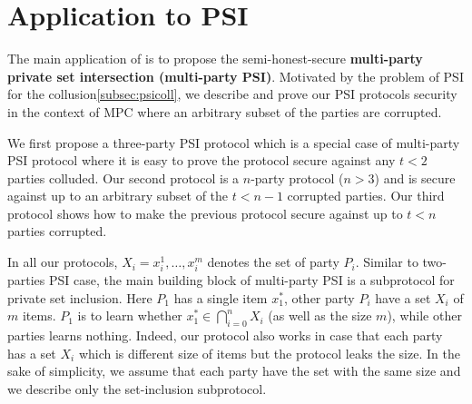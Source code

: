\section{Application to PSI}
\label{sec:psi}
The main application of \OPPRF is to propose the semi-honest-secure \textbf{multi-party private set intersection (multi-party PSI)}. Motivated by the problem of PSI for the collusion\ref{subsec:psicoll}, we describe and prove our PSI protocols security in the context of MPC where an arbitrary subset of the parties are corrupted.  

We first propose a three-party PSI protocol which is a special case of multi-party PSI protocol where it is easy to prove the protocol secure against any $t<2$ parties colluded. Our second protocol is a $n$-party protocol ($n >3 $) and is secure against up to an arbitrary subset of the $t<n-1$ corrupted parties. Our third protocol shows how to make the previous protocol secure against up to $t<n$ parties corrupted. %

In all our protocols, $X_i={x^1_i, \ldots, x^m_i}$ denotes the set of party $P_i$.  Similar to two-parties PSI case, the main building block of multi-party PSI is a subprotocol for private set inclusion. Here $P_1$ has a single item $x^*_1$, other party $P_i$ have a set $X_i$ of $m$ items. $P_1$ is to learn whether $x^*_1 \in \bigcap\limits_{i=0}^n X_i$ (as well as the size $m$), while other parties learns nothing. Indeed, our protocol also works in case that each party has a set $X_i$ which is different size of items but the protocol leaks the size. In the sake of simplicity, we assume that each party have the set with the same size and we describe only the set-inclusion subprotocol. 

